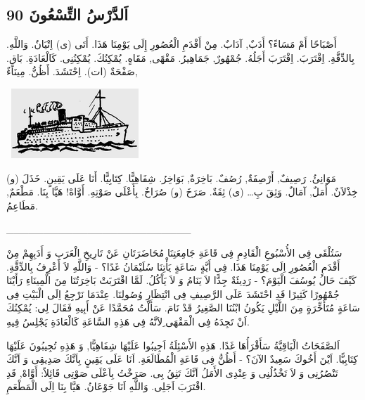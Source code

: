 \documentclass[a5paper]{article}
\begin{document}
\subsection{اَلدَّرْسُ التِّسْعُونَ 90}
أَصْبَاحًا أَمْ مَسَاءً؟ أَدَبٌ, آدَابٌ. مِنْ أَقْدَمِ الْعُصُورِ إِلَى يَوْمِنَا هَذَا. أَتَى (ى) اِتْيَانٌ. وَاللَّهِ. بِالدِّقَّةِ. اِقْتَرَبَ. اِقْتَرَبَ أَجَلُهُ. جُمْهُورٌ, جَمَاهِيرُ. مَقْهًى, مَقَاهٍ. يُمْكِنُكَ. يُمْكِنُنِى. كَالْعَادَةِ. بَاقٍ. صَفْحَةٌ (ات). اِحْتَشَدَ. أَظُنُّ. مِينَاءٌ, 

\  \includegraphics[width=1.8854in,height=1.0311in]{images/MuhammadBagauddinprettified-img253.png} 

مَوَانِئُ. رَصِيفٌ, أَرْصِفَةٌ, رُصُفٌ. بَاخِرَةٌ, بَوَاخِرُ. شِفَاهِيًّا. كِتَابِيًّا. أَنَا عَلَى يَقِينٍ. خَذَلَ (و) خِذْلاَنٌ. أَمَلٌ, آمَالٌ. وَثِقَ بِ… (ى) ثِقَةٌ. صَرَخَ (و) صُرَاخٌ. بِأَعْلَى صَوْتِهِ. أَوَّاهْ! هَيَّا بِنَا. مَطْعَمٌ, مَطَاعِمُ.

\_\_\_\_\_\_\_\_\_\_\_\_\_\_\_\_\_\_\_\_\_\_\_\_\_

سَتُلْقَى فِى الأُسْبُوعِ الْقَادِمِ فِى قَاعَةِ جَامِعَتِنَا مُحَاضَرَتَانِ عَنْ تَارِيخِ الْعَرَبِ وَ أَدَبِهِمْ مِنْ أَقْدَمِ الْعُصُورِ اِلَى يَوْمِنَا هَذَا. فِى أَيَّةٍ سَاعَةٍ يَأْتِنَا سُلَيْمَانُ غَدًا؟ - وَاللَّهِ لاَ أَعْرِفُ بِالدِّقَّةِ. كَيْفَ حَالُ يُوسُفَ الْيَوْمَ؟ - رَدِيئَةٌ جِدًّا لاَ يَنَامُ وَ لاَ يَاْكُلُ. لَمَّا اقْتَرَبَتْ بَاخِرَتُنَا مِنَ الْمِينَاءِ رَأَيْنَا جُمْهُورًا كَثِيرًا قَدِ احْتَشَدَ عَلَى الرَّصِيفِ فِى انْتِظَارِ وُصُولِنَا. عِنْدَمَا نَرْجِعُ اِلَى الْبَيْتِ فِى سَاعَةٍ مُتَأَخِّرَةٍ مِنَ اللَّيْلِ يَكُونُ ابْنُنَا الصَّغِيرُ قَدْ نَامَ. سَأَلْتُ مُحَمَّدًا عَنْ أَبِيهِ فَقَالَ لِى: يُمْكِنُكَ اَنْ تَجِدَهُ فِى الْمَقْهَى ِلاَنَّهُ فِى هَذِهِ السَّاعَةِ كَالْعَادَةِ يَجْلِسُ فِيهِ.

اَلصَّفَحَاتُ الْبَاقِيَّةُ سَأَقْرَأُهَا غَدًا. هَذِهِ الأَسْئِلَةُ اَجِيبُوا عَلَيْهَا شِفَاهِيًّا, وَ هَذِهِ تُجِيبُونَ عَلَيْهَا كِتَابِيًّا. اَيْنَ أَخُوكَ سَعِيدٌ الآنَ؟ - أَظُنُّ فِى قَاعَةِ الْمُطَالَعَةِ. اَنَا عَلَى يَقِينٍ بِاَنَّكَ صَدِيقِى وَ اَنَّكَ تَنْصُرُنِى وَ لاَ تَخْذُلُنِى وَ عِنْدِى الأَمَلُ اَنَّكَ تَثِقُ بِى. صَرَخْتُ بِاَعْلَى صَوْتِى قَائِلاً: أَوَّاهْ, قَدِ اقْتَرَبَ اَجَلِى. وَاللَّهِ اَنَا جَوْعَانُ. هَيَّا بِنَا اِلَى الْمَطْعَمِ.
\end{document}
